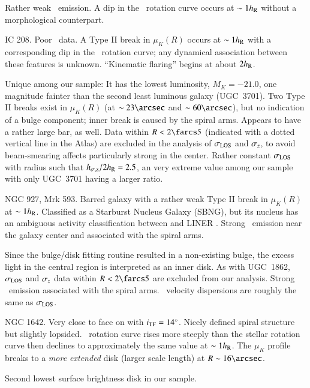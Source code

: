 \documentclass[traditabstract]{aa} %
\begin{document}
\begin{list}{}
  Rather weak \oiii\ emission.  A dip in the \oiii\ rotation curve occurs at
  $\sim1h_{\rm R}$ without a morphological counterpart.
%
  \item[{\bf UGC  1635:}] IC 208. Poor \oiii\ data. A Type II break in
  $\mu_K(R)$ occurs at $\sim1h_{\rm R}$ with a corresponding dip in the \oiii\
  rotation curve; any dynamical association between these features is unknown.
  ``Kinematic flaring'' begins at about $2h_{\rm R}$.
%
  \item[{\bf UGC  1862:}] Unique among our sample:  It has the lowest
  luminosity, $M_K=-21.0$, one magnitude fainter than the second least luminous
  galaxy (UGC~3701).  Two Type II breaks exist in $\mu_K(R)$ (at $\sim
  23\arcsec$ and $\sim 60\arcsec$), but no indication of a bulge component;
  inner break is caused by the spiral arms.  Appears to have a rather large bar,
  as well.  Data within $R<2\farcs5$ (indicated with a dotted vertical line in
  the Atlas) are excluded in the analysis of $\sigma_{\rm LOS}$ and $\sigma_z$, to avoid
  beam-smearing affects particularly strong in the center.  Rather constant
  $\sigma_{\rm LOS}$ with radius such that $h_{\sigma{\rm,z}}/2h_{\rm R} = 2.5$, an very extreme value among
  our sample with only UGC~3701 having a larger ratio.
%
  \item[{\bf UGC  1908:}] NGC 927, Mrk 593.  Barred galaxy with a rather weak
  Type II break in $\mu_K(R)$ at $\sim 1h_{\rm R}$.  Classified as a Starburst Nucleus
  Galaxy (SBNG), but its nucleus has an ambiguous activity classification
  between \ion{H}{2} and LINER \citep{contini1998}.  Strong \oiii\
  emission near the galaxy center and associated with the spiral arms.
%
  \item[{\bf UGC  3091:}] Since the bulge/disk fitting routine resulted in a
  non-existing bulge, the excess light in the central region is interpreted as
  an inner disk.  As with UGC~1862, $\sigma_{\rm LOS}$ and $\sigma_z$ data within $R<2\farcs5$
  are excluded from our analysis.  Strong \oiii\ emission associated with the
  spiral arms.  \oiii\ velocity dispersions are roughly the same as $\sigma_{\rm LOS}$.
%
  \item[{\bf UGC  3140:}] NGC 1642. Very close to face on with $i_{\rm TF}=14\mbox{$^\circ$}$.
  Nicely defined spiral structure but slightly lopsided.  \oiii\ rotation curve
  rises more steeply than the stellar rotation curve then declines to
  approximately the same value at $\sim1h_{\rm R}$.  The $\mu_K$ profile breaks to a
  {\it more extended} disk (larger scale length) at $R\sim16\arcsec$.
%
  \item[{\bf UGC  3701:}] Second lowest surface brightness disk in our sample.

\end{list}
\end{document}
